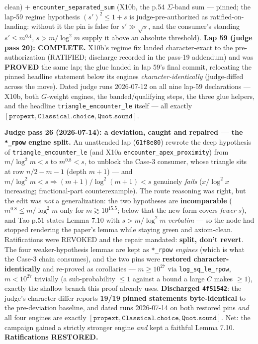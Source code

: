 \begin{lemma}
clean) + \texttt{encounter\_separated\_sum} (X10b, the p.54 \(\Sigma\)-band sum ---
pinned; the lap-59 regime hypothesis \((s')^2 \le 1+s\) is judge-pre-authorized as
ratified-on-landing: without it the pin is false for \(s' \gg \sqrt{s}\), and the
consumer's standing \(s' \le m^{0.4}\), \(s > m/\log^2 m\) supply it above an absolute
threshold).
\textbf{Lap 59 (judge pass 20): COMPLETE.}  X10b's regime fix landed character-exact to
the pre-authorization (RATIFIED; discharge recorded in the pass-19 addendum) and was
\textbf{PROVED} the same lap; the glue landed in lap 59's final commit, relocating the
pinned headline statement below its engines \emph{character-identically} (judge-diffed
across the move).  Dated judge runs 2026-07-12 on all nine lap-59 declarations ---
X10b, both \(G\)-weight engines, the banded/qualifying steps, the three glue helpers,
and the headline \texttt{triangle\_encounter\_le} itself --- all exactly
\([\texttt{propext}, \texttt{Classical.choice}, \texttt{Quot.sound}]\).

\textbf{Judge pass 26 (2026-07-14): a deviation, caught and repaired --- the
\texttt{*\_rpow} engine split.}  An unattended lap (\texttt{61f8e80}) rewrote the deep
hypothesis of \texttt{triangle\_encounter\_le} (and X10a \texttt{encounter\_apex\_proximity})
from \(m/\log^2 m < s\) to \(m^{0.8} < s\), to unblock the Case-3 consumer, whose triangle
sits at row \(n/2-m-1\) (depth \(m+1\)) --- and \(m/\log^2 m < s \Rightarrow
(m+1)/\log^2(m+1) < s\) genuinely \emph{fails} (\(x/\log^2 x\) increasing; fractional-part
counterexample).  The route reasoning was right, but the edit was \emph{not} a generalization:
the two hypotheses are \textbf{incomparable} (\(m^{0.8} \le m/\log^2 m\) only for \(m \gtrsim
10^{15.5}\); below that the new form covers \emph{fewer} \(s\)), and Tao p.51 states Lemma 7.10
with \(s > m/\log^2 m\) \emph{verbatim} --- so the node had stopped rendering the paper's lemma
while staying green and axiom-clean.  Ratifications were REVOKED and the repair mandated:
\textbf{split, don't revert}.  The four weaker-hypothesis lemmas are kept as
\texttt{*\_rpow} \emph{engines} (which is what the Case-3 chain consumes), and the two pins
were \textbf{restored character-identically} and re-proved as corollaries --- \(m \ge 10^{27}\)
via \texttt{log\_sq\_le\_rpow}, \(m < 10^{27}\) trivially (a sub-probability \(\le 1\) against a
bound a large \(C\) makes \(\ge 1\)), exactly the shallow branch this proof already uses.
\textbf{Discharged \texttt{4f51542}}: the judge's character-differ reports \textbf{19/19 pinned
statements byte-identical} to the pre-deviation baseline, and dated runs 2026-07-14 on both
restored pins \emph{and} all four engines are exactly \([\texttt{propext},
\texttt{Classical.choice}, \texttt{Quot.sound}]\).  Net: the campaign gained a strictly stronger
engine \emph{and} kept a faithful Lemma 7.10.  \textbf{Ratifications RESTORED.}
\end{lemma}
